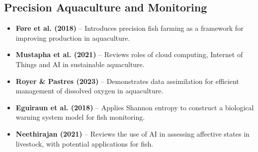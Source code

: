 \documentclass[11pt,a4paper]{article}
\begin{document}
\subsection*{Precision Aquaculture and Monitoring}
\begin{itemize}
    \item \textbf{Føre et al. (2018)} \cite{fore2018precision} -- Introduces precision fish farming as a framework for improving production in aquaculture.
    
    \item \textbf{Mustapha et al. (2021)} \cite{mustapha2021sustainable} -- Reviews roles of cloud computing, Internet of Things and AI in sustainable aquaculture.
    
    \item \textbf{Royer \& Pastres (2023)} \cite{royer2023data} -- Demonstrates data assimilation for efficient management of dissolved oxygen in aquaculture.
    
    \item \textbf{Eguiraun et al. (2018)} \cite{eguiraun2018reducing} -- Applies Shannon entropy to construct a biological warning system model for fish monitoring.
    
    \item \textbf{Neethirajan (2021)} \cite{neethirajan2021use} -- Reviews the use of AI in assessing affective states in livestock, with potential applications for fish.
\end{itemize}
\end{document}
